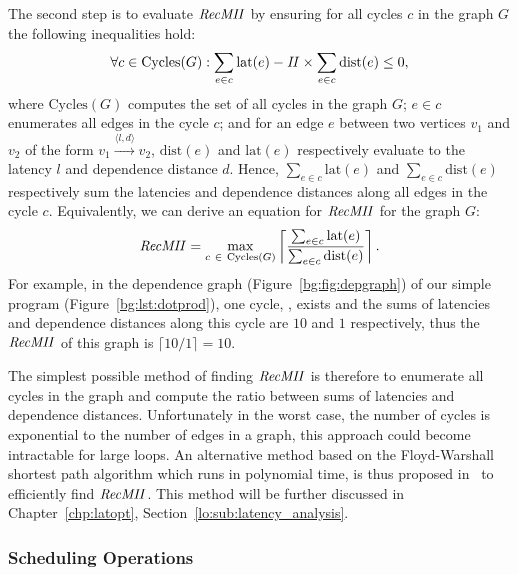 The second step is to evaluate $\mathit{RecMII}$ by ensuring for all cycles $c$ in the
graph $G$ the following inequalities hold:
\begin{equation}
    \forall c \in \mathrm{Cycles}(G):
        \sum_{e \in c} \mathrm{lat}(e) - \mathit{II} \times
        \sum_{e \in c} \mathrm{dist}(e) \leq 0,
\end{equation}
where $\mathrm{Cycles}(G)$ computes the set of all cycles in the graph $G$;
$e \in c$ enumerates all edges in the cycle $c$; and for an edge $e$ between
two vertices $v_1$ and $v_2$ of the form $v_1 \xrightarrow{\langle l, d
\rangle} v_2$, $\mathrm{dist}(e)$ and $\mathrm{lat}(e)$ respectively evaluate
to the latency $l$ and dependence distance $d$.  Hence, $\sum_{e \in c}
\mathrm{lat}(e)$ and $\sum_{e \in c} \mathrm{dist}(e)$ respectively sum
the latencies and dependence distances along all edges in the cycle $c$.
Equivalently, we can derive an equation for $\mathit{RecMII}$ for the graph $G$:
\begin{equation}
    \RecMII = \max_{c~\in~\mathrm{Cycles}(G)}
        \left\lceil \frac{%
            \sum_{e \in c} \mathrm{lat}(e)
        }{%
            \sum_{e \in c} \mathrm{dist}(e)
        }
        \right\rceil.
\end{equation}
For example, in the dependence graph (Figure~\ref{bg:fig:depgraph}) of our
simple program (Figure~\ref{bg:lst:dotprod}), one cycle,
,
exists and the sums of latencies and dependence distances along this cycle are
$10$ and $1$ respectively, thus the $\mathit{RecMII}$ of this graph is $\lceil 10 / 1
\rceil = 10$.

The simplest possible method of finding $\mathit{RecMII}$ is therefore to enumerate
all cycles in the graph and compute the ratio between sums of latencies and
dependence distances.  Unfortunately in the worst case, the number of cycles
is exponential to the number of edges in a graph, this approach could become
intractable for large loops.  An alternative method based on the Floyd-Warshall
shortest path algorithm which runs in polynomial time, is thus proposed
in~\cite{rau94} to efficiently find $\mathit{RecMII}$.  This method will be further
discussed in Chapter~\ref{chp:latopt}, Section~\ref{lo:sub:latency_analysis}.

\subsubsection{Scheduling Operations}

